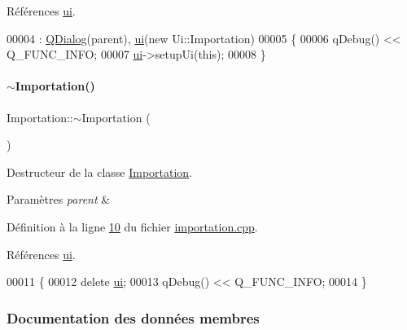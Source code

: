 Références \hyperlink{importation_8h_source_l00038}{ui}.


\begin{DoxyCode}
00004                                         : \hyperlink{class_q_dialog}{QDialog}(parent), \hyperlink{class_importation_ace5d522c27957bac47fd8d3234af1d2e}{ui}(\textcolor{keyword}{new} Ui::Importation)
00005 \{
00006      qDebug() << Q\_FUNC\_INFO;
00007     \hyperlink{class_importation_ace5d522c27957bac47fd8d3234af1d2e}{ui}->setupUi(\textcolor{keyword}{this});
00008 \}
\end{DoxyCode}
\mbox{\label{class_importation_ac9f6f0a390369d5732576fb38a8e62c7}} 
\paragraph{\texorpdfstring{$\sim$\+Importation()}{~Importation()}}
{\footnotesize\ttfamily Importation\+::$\sim$\+Importation (\begin{DoxyParamCaption}{ }\end{DoxyParamCaption})}



Destructeur de la classe \hyperlink{class_importation}{Importation}. 


\begin{DoxyParams}{Paramètres}
{\em parent} & \\
\hline
\end{DoxyParams}


Définition à la ligne \hyperlink{importation_8cpp_source_l00010}{10} du fichier \hyperlink{importation_8cpp_source}{importation.\+cpp}.



Références \hyperlink{importation_8h_source_l00038}{ui}.


\begin{DoxyCode}
00011 \{
00012     \textcolor{keyword}{delete} \hyperlink{class_importation_ace5d522c27957bac47fd8d3234af1d2e}{ui};
00013     qDebug() << Q\_FUNC\_INFO;
00014 \}
\end{DoxyCode}


\subsubsection{Documentation des données membres}
\mbox{\label{class_importation_ace5d522c27957bac47fd8d3234af1d2e}} 
